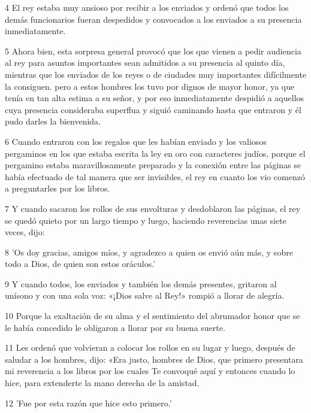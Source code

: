\par 4 El rey estaba muy ansioso por recibir a los enviados y ordenó que todos los demás funcionarios fueran despedidos y convocados a los enviados a su presencia inmediatamente.

\par 5 Ahora bien, esta sorpresa general provocó que los que vienen a pedir audiencia al rey para asuntos importantes sean admitidos a su presencia al quinto día, mientras que los enviados de los reyes o de ciudades muy importantes difícilmente la consiguen. pero a estos hombres los tuvo por dignos de mayor honor, ya que tenía en tan alta estima a su señor, y por eso inmediatamente despidió a aquellos cuya presencia consideraba superflua y siguió caminando hasta que entraron y él pudo darles la bienvenida.

\par 6 Cuando entraron con los regalos que les habían enviado y los valiosos pergaminos en los que estaba escrita la ley en oro con caracteres judíos, porque el pergamino estaba maravillosamente preparado y la conexión entre las páginas se había efectuado de tal manera que ser invisibles, el rey en cuanto los vio comenzó a preguntarles por los libros.

\par 7 Y cuando sacaron los rollos de sus envolturas y desdoblaron las páginas, el rey se quedó quieto por un largo tiempo y luego, haciendo reverencias unas siete veces, dijo:

\par 8 'Os doy gracias, amigos míos, y agradezco a quien os envió aún más, y sobre todo a Dios, de quien son estos oráculos.'

\par 9 Y cuando todos, los enviados y también los demás presentes, gritaron al unísono y con una sola voz: «¡Dios salve al Rey!» rompió a llorar de alegría.

\par 10 Porque la exaltación de su alma y el sentimiento del abrumador honor que se le había concedido le obligaron a llorar por su buena suerte.

\par 11 Les ordenó que volvieran a colocar los rollos en su lugar y luego, después de saludar a los hombres, dijo: «Era justo, hombres de Dios, que primero presentara mi reverencia a los libros por los cuales Te convoqué aquí y entonces cuando lo hice, para extenderte la mano derecha de la amistad.

\par 12 'Fue por esta razón que hice esto primero.'

